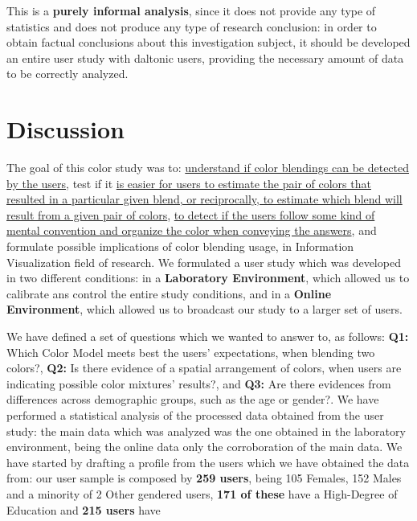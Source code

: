 %
\newpage
This is a \textbf{purely informal analysis}, since it does not provide any type of statistics and does not produce any type of research conclusion: in order to obtain factual conclusions about this investigation subject, it should be developed an entire user study with daltonic users, providing the necessary amount of data to be correctly
analyzed.
%
%
\section{Discussion}
\label{sec:results_discussion}
%
The goal of this color study was to: \ul{understand if color blendings can be detected by the users}, test if it \ul{is easier for users to estimate the pair
of colors that resulted in a particular given blend, or reciprocally, to estimate which blend will result from a
given pair of colors}, \ul{to detect if the users follow some kind of mental convention and organize the color
when conveying the answers}, and formulate possible implications of color blending usage, in Information Visualization field of research. We formulated a user study which was developed in two
different conditions: in a \textbf{Laboratory Environment}, which allowed us to calibrate ans control the entire study conditions, and in a \textbf{Online Environment}, which allowed us to broadcast our study to a larger set of users. \par
%
We have defined a set of questions which we wanted to answer to, as follows:
\textbf{Q1:} Which Color Model meets best the users' expectations, when blending two colors?,
\textbf{Q2:} Is there evidence of a spatial arrangement of colors, when users are indicating possible color mixtures' results?, and
\textbf{Q3:} Are there evidences from differences across demographic groups, such as the age or gender?.
%
We have performed a statistical analysis of the processed data obtained from the user study: the main data which was analyzed was the one obtained in the laboratory environment, being the online data only the corroboration of the main data. We have started by drafting a
profile from the users which we have obtained the data from: our user sample is composed by \textbf{259 users}, being 105 Females, 152 Males and a minority of 2 Other gendered users, \textbf{171 of these} have a High-Degree of Education and \textbf{215 users} have
